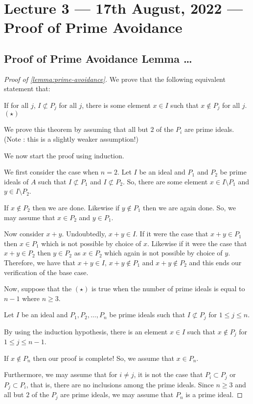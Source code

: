 \section{Lecture 3 --- 17th August, 2022 --- Proof of Prime Avoidance}
\subsection{Proof of Prime Avoidance Lemma \ldots}
\begin{proof}[Proof of \ref{lemma:prime-avoidance}]
    We prove that the following equivalent statement that:
    
    If for all $j$, $I\not\subset P_j$ for all $j$, there is some element $x\in I$ such that $x\not\in P_j$ for all $j$. $(\star)$


    We prove this theorem by assuming that all but $2$ of the $P_i$ are prime ideals. (Note : this is a slightly weaker assumption!)
    
     We now start the proof using induction.
    
    We first consider the case when $n=2$. Let $I$ be an ideal and $P_1$ and $P_2$ be prime ideals of $A$ such that $I \not \subset P_1$ and $I \not \subset P_2$. So, there are some element $x\in I \setminus P_1$ and $y\in I \setminus P_2$.

    If $x\not \in P_2$ then we are done. Likewise if $y\not \in P_1$ then we are again done. So, we may assume that $x\in P_2$ and $y\in P_1$.

    Now consider $x+y$. Undoubtedly, $x+y \in I$. If it were the case that $x+y \in P_1$ then $x\in P_1$ which is not possible by choice of $x$. Likewise if it were the case that $x+y \in P_2$ then $y \in P_2$ as $x\in P_2$ which again is not possible by choice of $y$. Therefore, we have that $x+y \in I$, $x+y \not \in P_1$ and $x+y \not \in P_2$ and this ends our verification of the base case.

    Now, suppose that the $(\star)$ is true when the number of prime ideals is equal to $n-1$ where $n\ge 3$. 

    Let $I$ be an ideal and $P_1 , P_2 , \ldots , P_n$ be prime ideals such that $I \not \subset P_j$ for $1\le j \le n$. 

    By using the induction hypothesis, there is an element $x\in I$ such that $x \not \in P_j$ for $1 \le j \le n-1$.


    If $x\not\in P_n$ then our proof is complete! So, we assume that $x\in P_n$.
    
    Furthermore, we may assume that for $i\ne j$, it is not the case that $P_i \subset P_j$ or $P_j \subset P_i$, that is, there are no inclusions among the prime ideals. Since $n\ge 3$ and all but $2$ of the $P_j$ are prime ideals, we may assume that $P_n$ is a prime ideal.
    

\end{proof}
